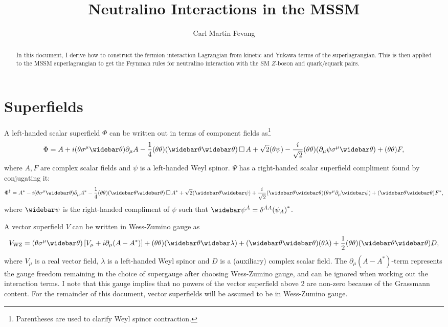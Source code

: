 \documentclass[english, notitlepage]{article}
\title{Neutralino Interactions in the MSSM}
\author{Carl Martin Fevang}
\begin{document}
\maketitle

\begin{abstract}
    \noindent
    In this document, I derive how to construct the fermion interaction Lagrangian from kinetic and Yukawa terms of the superlagrangian. This is then applied to the MSSM superlagrangian to get the Feynman rules for neutralino interaction with the SM \(Z\)-boson and quark/squark pairs.
\end{abstract}

\section{Superfields}
    A left-handed scalar superfield $\Phi$ can be written out in terms of component
    fields as\footnote{Parentheses are used to clarify Weyl spinor contraction.}
    \begin{align}
        \Phi = A + i(\theta\sigma^\mu\wbar\theta) \partial_\mu A - \frac{1}{4} (\theta\theta)(\wbar\theta\wbar\theta) \dA A +
        \sqrt{2} (\theta\psi) - \frac{i}{\sqrt{2}} (\theta\theta) (\partial_\mu \psi \sigma^\mu \wbar\theta) + (\theta\theta) F,
    \end{align}
    where $A, F$ are complex scalar fields and $\psi$ is a left-handed Weyl spinor. $\Psi$ has a right-handed scalar superfield compliment found by conjugating it:
    \begin{align}
        \Phi^\dag = A^* - i(\theta\sigma^\mu\wbar\theta) \partial_\mu A^* - \frac{1}{4} (\theta\theta)(\wbar\theta\wbar\theta) \dA A^* +
        \sqrt{2} (\wbar\theta\wbar\psi) + \frac{i}{\sqrt{2}} (\wbar\theta\wbar\theta)
        (\theta \sigma^\mu \partial_\mu \wbar\psi) + (\wbar\theta\wbar\theta) F^*,
    \end{align}
    where $\wbar\psi$ is the right-handed compliment of $\psi$ such that $\wbar\psi^{\dot A} = \delta^{\dot A A} {(\psi_A)}^*$.

    A vector superfield $V$ can be written in Wess-Zumino gauge as
    \begin{align}
        \msub{V}{WZ} = (\theta\sigma^\mu\wbar\theta) \bclosed{V_\mu + i\partial_\mu (A - A^*)} + (\theta\theta) (\wbar\theta\wbar\lambda) +
        (\wbar\theta\wbar\theta)(\theta\lambda) + \frac{1}{2}
        (\theta\theta)(\wbar\theta\wbar\theta) D,
    \end{align}
    where $V_\mu$ is a real vector field, $\lambda$ is a left-handed Weyl spinor and $D$ is a (auxiliary) complex scalar field. The $\partial_\mu (A-A^*)$-term represents the gauge freedom remaining in the choice of
    supergauge after choosing Wess-Zumino gauge, and can be ignored when working
    out the interaction terms. I note that this gauge implies that no powers of the vector superfield above 2 are non-zero because of the Grassmann content. For the remainder of this document, vector superfields will be assumed to be in Wess-Zumino gauge.
\end{document}
